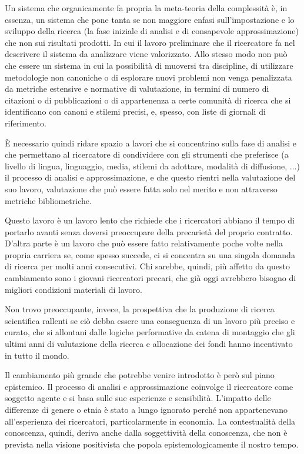 \documentclass[a4paper, headings=standardclasses]{scrartcl}
\begin{document}
Un sistema che organicamente fa propria la meta-teoria della complessità è, in essenza, un sistema che pone tanta se non maggiore enfasi sull'impostazione e lo sviluppo della ricerca (la fase iniziale di analisi e di consapevole approssimazione) che non sui risultati prodotti. In cui il lavoro preliminare che il ricercatore fa nel descrivere il sistema da analizzare viene valorizzato.
Allo stesso modo non può che essere un sistema in cui la possibilità di muoversi tra discipline, di utilizzare metodologie non canoniche o di esplorare nuovi problemi non venga penalizzata da metriche estensive e normative di valutazione, in termini di numero di citazioni o di pubblicazioni o di appartenenza a certe comunità di ricerca che si identificano con canoni e stilemi precisi, e, spesso, con liste di giornali di riferimento.

È necessario quindi ridare spazio a lavori che si concentrino sulla fase di analisi e che permettano al ricercatore di condividere con gli strumenti che preferisce (a livello di lingua, linguaggio, media, stilemi da adottare, modalità di diffusione, ...) il processo di analisi e approssimazione, e che questo rientri nella valutazione del suo lavoro, valutazione che può essere fatta solo nel merito e non attraverso metriche bibliometriche. 

Questo lavoro è un lavoro lento che richiede che i ricercatori abbiano il tempo di portarlo avanti senza doversi preoccupare della precarietà del proprio contratto. D'altra parte è un lavoro che può essere fatto relativamente poche volte nella propria carriera se, come spesso succede, ci si concentra su una singola domanda di ricerca per molti anni consecutivi.
Chi sarebbe, quindi, più affetto da questo cambiamento sono i giovani ricercatori precari, che già oggi avrebbero bisogno di migliori condizioni materiali di lavoro.

Non trovo preoccupante, invece, la prospettiva che la produzione di ricerca scientifica rallenti se ciò debba essere una conseguenza di un lavoro più preciso e curato, che si allontani dalle logiche performative da catena di montaggio che gli ultimi anni di valutazione della ricerca e allocazione dei fondi hanno incentivato in tutto il mondo.

Il cambiamento più grande che potrebbe venire introdotto è però sul piano epistemico.
Il processo di analisi e approssimazione coinvolge il ricercatore come soggetto agente e si basa sulle sue esperienze e sensibilità.
L'impatto delle differenze di genere o etnia è stato a lungo ignorato perché non appartenevano all'esperienza dei ricercatori, particolarmente in economia.
La contestualità della conoscenza, quindi, deriva anche dalla soggettività della conoscenza, che non è prevista nella visione positivista che popola epistemologicamente il nostro tempo.
\end{document}

